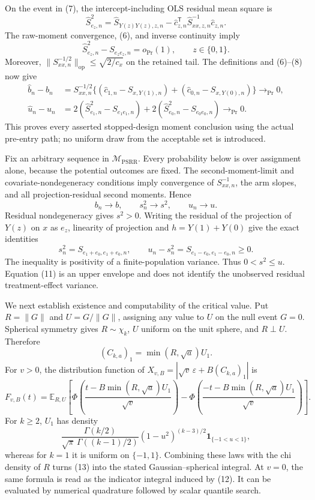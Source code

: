 On the event in (7), the intercept-including OLS residual mean square is
\[
 \widehat S_{e_z,n}^2
 =\widehat S_{Y(z)Y(z),z,n}
  -\widehat c_{z,n}^{\mathsf T}
   \widehat S_{xx,z,n}^{-1}\widehat c_{z,n}.
\]
The raw-moment convergence, (6), and inverse continuity imply
\[
 \widehat S_{e_z,n}^2-S_{e_ze_z,n}=o_{\Pr}(1),
 \qquad z\in\{0,1\}. \tag{8}
\]
Moreover, \(\|S_{xx,n}^{-1/2}\|_{\mathrm{op}}\le\sqrt{2/c_x}\) on the retained tail.  The definitions and (6)--(8) now give
\[
 \begin{aligned}
 \widehat b_n-b_n
 &=S_{xx,n}^{-1/2}\bigl\{(\widehat c_{1,n}-S_{x,Y(1),n})
 +(\widehat c_{0,n}-S_{x,Y(0),n})\bigr\}
 \longrightarrow_{\Pr}0,\\
 \widehat u_n-u_n
 &=2(\widehat S_{e_1,n}^2-S_{e_1e_1,n})
  +2(\widehat S_{e_0,n}^2-S_{e_0e_0,n})
 \longrightarrow_{\Pr}0. \tag{9}
 \end{aligned}
\]
This proves every asserted stopped-design moment conclusion using the actual pre-entry path; no uniform draw from the acceptable set is introduced.

Fix an arbitrary sequence in \(\mathcal M_{\mathrm{PSRR}}\).  Every probability below is over assignment alone, because the potential outcomes are fixed.  The second-moment-limit and covariate-nondegeneracy conditions imply convergence of \(S_{xx,n}^{-1}\), the arm slopes, and all projection-residual second moments.  Hence
\[
 b_n\to b,\qquad s_n^2\to s^2,\qquad u_n\to u. \tag{10}
\]
Residual nondegeneracy gives \(s^2>0\).  Writing the residual of the projection of \(Y(z)\) on \(x\) as \(e_z\), linearity of projection and \(h=Y(1)+Y(0)\) give the exact identities
\[
 s_n^2=S_{e_1+e_0,e_1+e_0,n},\qquad
 u_n-s_n^2=S_{e_1-e_0,e_1-e_0,n}\ge0. \tag{11}
\]
The inequality is positivity of a finite-population variance.  Thus \(0<s^2\le u\).  Equation (11) is an upper envelope and does not identify the unobserved residual treatment-effect variance.

We next establish existence and computability of the critical value.  Put \(R=\|G\|\) and \(U=G/\|G\|\), assigning any value to \(U\) on the null event \(G=0\).  Spherical symmetry gives \(R\sim\chi_k\), \(U\) uniform on the unit sphere, and \(R\perp U\).  Therefore
\[
 (C_{k,a})_1=\min(R,\sqrt a)U_1. \tag{12}
\]
For \(v>0\), the distribution function of
\(X_{v,B}=|\sqrt v\,\varepsilon+B(C_{k,a})_1|\) is
\[
 F_{v,B}(t)=\mathbb E_{R,U}\!\left[
 \Phi\!\left(\frac{t-B\min(R,\sqrt a)U_1}{\sqrt v}\right)
 -\Phi\!\left(\frac{-t-B\min(R,\sqrt a)U_1}{\sqrt v}\right)
 \right]. \tag{13}
\]
For \(k\ge2\), \(U_1\) has density
\[
 \frac{\Gamma(k/2)}{\sqrt\pi\,\Gamma((k-1)/2)}
 (1-u^2)^{(k-3)/2}\mathbf 1_{\{-1<u<1\}},
\]
whereas for \(k=1\) it is uniform on \(\{-1,1\}\).  Combining these laws with the chi density of \(R\) turns (13) into the stated Gaussian--spherical integral.  At \(v=0\), the same formula is read as the indicator integral induced by (12).  It can be evaluated by numerical quadrature followed by scalar quantile search.

